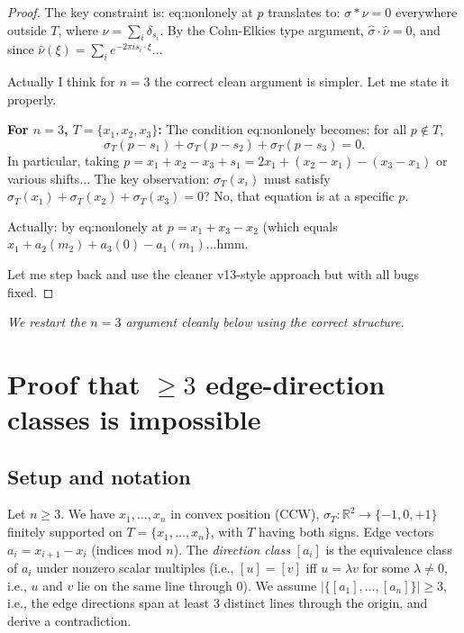 \begin{proof}
The key constraint is: eq:nonlonely at $p$ translates to: $\sigma * \nu = 0$ everywhere outside $T$, where $\nu = \sum_i \delta_{s_i}$. By the Cohn-Elkies type argument, $\hat\sigma \cdot \hat\nu = 0$, and since $\hat\nu(\xi) = \sum_i e^{-2\pi i s_i\cdot\xi}$...

Actually I think for $n=3$ the correct clean argument is simpler. Let me state it properly.

\textbf{For $n=3$, $T=\{x_1,x_2,x_3\}$:} The condition eq:nonlonely becomes: for all $p \notin T$,
\[
  \sigma_T(p-s_1)+\sigma_T(p-s_2)+\sigma_T(p-s_3)=0.
\]
In particular, taking $p = x_1 + x_2 - x_3 + s_1 = 2x_1 + (x_2-x_1) - (x_3-x_1)$ or various shifts... The key observation: $\sigma_T(x_i)$ must satisfy $\sigma_T(x_1)+\sigma_T(x_2)+\sigma_T(x_3) = 0$? No, that equation is at a specific $p$.

Actually: by eq:nonlonely at $p = x_1 + x_3 - x_2$ (which equals $x_1 + a_2(m_2) + a_3(0) - a_1(m_1)... $hmm.

Let me step back and use the cleaner v13-style approach but with all bugs fixed.
\end{proof}

\bigskip
\noindent\textit{We restart the $n=3$ argument cleanly below using the correct structure.}
\bigskip


\section*{Proof that $\geq 3$ edge-direction classes is impossible}

\subsection*{Setup and notation}

Let $n \geq 3$. We have $x_1,\ldots,x_n$ in convex position (CCW), $\sigma_T : \mathbb{R}^2 \to \{-1,0,+1\}$ finitely supported on $T = \{x_1,\ldots,x_n\}$, with $T$ having both signs. Edge vectors $a_i = x_{i+1}-x_i$ (indices mod $n$). The \emph{direction class} $[a_i]$ is the equivalence class of $a_i$ under nonzero scalar multiples (i.e., $[u]=[v]$ iff $u = \lambda v$ for some $\lambda \neq 0$, i.e., $u$ and $v$ lie on the same line through $0$). We assume $|\{[a_1],\ldots,[a_n]\}| \geq 3$, i.e., the edge directions span at least 3 distinct lines through the origin, and derive a contradiction.

